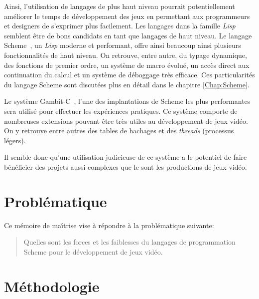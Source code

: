 \documentclass[12pt,oneside,letterpaper,francais]{book}
\newcommand{\lisp}{{\textit{Lisp }}}
\begin{document}
Ainsi, l'utilisation de langages de plus haut niveau pourrait
potentiellement améliorer le temps de développement des jeux en
permettant aux programmeurs et designers de s'exprimer plus
facilement. Les langages dans la famille \lisp semblent être de bons
candidats en tant que langages de haut niveau. Le langage
Scheme~\cite{R5RS}, un \lisp moderne et performant, offre ainsi
beaucoup ainsi plusieurs fonctionnalités de haut niveau. On retrouve,
entre autre, du typage dynamique, des fonctions de premier ordre, un
système de macro évolué, un accès direct aux continuation du calcul et
un système de déboggage très efficace. Ces particularités du langage
Scheme sont discutées plus en détail dans le chapitre
\ref{Chap:Scheme}.

Le système Gambit-C~\cite{Gambit4}, l'une des implantations de Scheme
les plus performantes~\cite{GAMBIT_BENCHMARKS} sera utilisé pour
effectuer les expériences pratiques. Ce système comporte de nombreuses
extensions pouvant être très utiles au développement de jeux vidéo. On
y retrouve entre autres des tables de hachages et des \textit{threads}
(processus légers).

Il semble donc qu'une utilisation judicieuse de ce système a le
potentiel de faire bénéficier des projets aussi complexes que le sont
les productions de jeux vidéo.

\section{Problématique}
Ce mémoire de maîtrise vise à répondre à la problématique suivante:

\begin{quote}
  Quelles sont les forces et les faiblesses du langages de
  programmation Scheme pour le développement de jeux vidéo.
\end{quote}

\section{Méthodologie}


\end{document}

